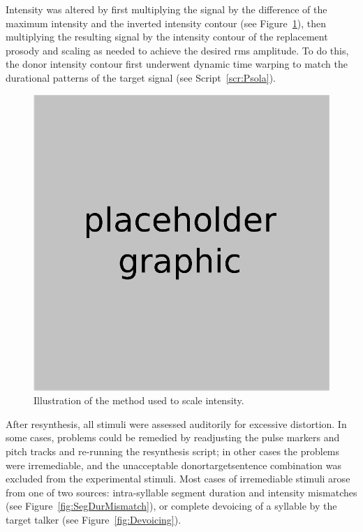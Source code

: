 Intensity was altered by first multiplying the signal by the difference of the maximum intensity and the inverted intensity contour (see Figure~\ref{fig:IntenManip}), then multiplying the resulting signal by the intensity contour of the replacement prosody and scaling as needed to achieve the desired \ac{rms} amplitude.  To do this, the donor intensity contour first underwent dynamic time warping to match the durational patterns of the target signal (see Script~\ref{scr:Psola}).

\begin{figure}
	\begin{centering}
	\includegraphics{figures/xxx.eps}
	\caption[Intensity scaling in resynthesis]{Illustration of the method used to scale intensity.\label{fig:IntenManip}}
	\end{centering}
\end{figure}

After resynthesis, all stimuli were assessed auditorily for excessive distortion.  In some cases, problems could be remedied by readjusting the pulse markers and pitch tracks and re-running the resynthesis script; in other cases the problems were irremediable, and the unacceptable donor\slsh{}target\slsh{}sentence combination was excluded from the experimental stimuli.  Most cases of irremediable stimuli arose from one of two sources: intra-syllable segment duration and intensity mismatches (see Figure~\ref{fig:SegDurMismatch}), or complete devoicing of a syllable by the target talker (see Figure~\ref{fig:Devoicing}).

